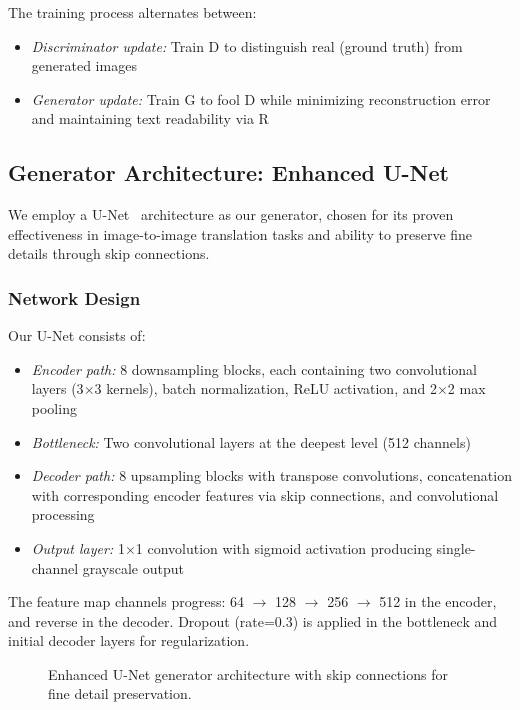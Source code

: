 \documentclass[journal]{IEEEtran}
\begin{document}
The training process alternates between:
\begin{itemize}
    \item \textit{Discriminator update:} Train D to distinguish real (ground truth) from generated images
    \item \textit{Generator update:} Train G to fool D while minimizing reconstruction error and maintaining text readability via R
\end{itemize}

\subsection{Generator Architecture: Enhanced U-Net}

We employ a U-Net~\cite{ronneberger2015unet} architecture as our generator, chosen for its proven effectiveness in image-to-image translation tasks and ability to preserve fine details through skip connections.

\subsubsection{Network Design}

Our U-Net consists of:
\begin{itemize}
    \item \textit{Encoder path:} 8 downsampling blocks, each containing two convolutional layers (3$\times$3 kernels), batch normalization, ReLU activation, and 2$\times$2 max pooling
    \item \textit{Bottleneck:} Two convolutional layers at the deepest level (512 channels)
    \item \textit{Decoder path:} 8 upsampling blocks with transpose convolutions, concatenation with corresponding encoder features via skip connections, and convolutional processing
    \item \textit{Output layer:} 1$\times$1 convolution with sigmoid activation producing single-channel grayscale output
\end{itemize}

The feature map channels progress: 64 $\rightarrow$ 128 $\rightarrow$ 256 $\rightarrow$ 512 in the encoder, and reverse in the decoder. Dropout (rate=0.3) is applied in the bottleneck and initial decoder layers for regularization.

\begin{figure}[!t]
\centering
\caption{Enhanced U-Net generator architecture with skip connections for fine detail preservation.}
\label{fig:unet_architecture}
\end{figure}
\end{document}
